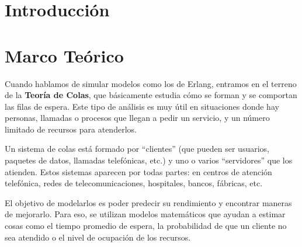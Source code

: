 \documentclass{article}
\begin{document}
\tableofcontents %

\newpage %



\section{Introducción}\label{sec:intr}



\section{Marco Teórico}\label{sec:marc}
Cuando hablamos de simular modelos como los de Erlang, entramos en el terreno de la \textbf{Teoría de Colas}, que básicamente estudia cómo se forman y se comportan las filas de espera. Este tipo de análisis es muy útil en situaciones donde hay personas, llamadas o procesos que llegan a pedir un servicio, y un número limitado de recursos para atenderlos.

Un sistema de colas está formado por ``clientes'' (que pueden ser usuarios, paquetes de datos, llamadas telefónicas, etc.) y uno o varios ``servidores'' que los atienden. Estos sistemas aparecen por todas partes: en centros de atención telefónica, redes de telecomunicaciones, hospitales, bancos, fábricas, etc.

El objetivo de modelarlos es poder predecir su rendimiento y encontrar maneras de mejorarlo. Para eso, se utilizan modelos matemáticos que ayudan a estimar cosas como el tiempo promedio de espera, la probabilidad de que un cliente no sea atendido o el nivel de ocupación de los recursos.
\end{document}
